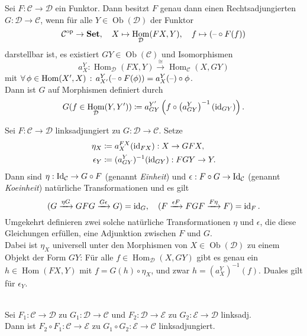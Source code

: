 \documentclass{cheat-sheet}
\newcommand{\SetC}{\mathbf{Set}} %
\newcommand{\op}{\mathrm{op}} %
\DeclareMathOperator{\Hom}{Hom} %
\newcommand{\Cat}{\mathcal{C}} %
\newcommand{\Dat}{\mathcal{D}} %
\newcommand{\Eat}{\mathcal{E}} %
\DeclareMathOperator{\Ob}{Ob} %
\begin{document}
\begin{bem}
  Sei $F : \Cat \to \Dat$ ein Funktor.
  Dann besitzt $F$ genau dann einen Rechtsadjungierten $G : \Dat \to \Cat$, wenn für alle $Y \in \Ob(\Dat)$ der Funktor
  \[
    \Cat^\op \to \SetC, \quad
    X \mapsto \Hom_\Dat(FX, Y), \quad
    f \mapsto (\blank \circ F(f))
  \]
  darstellbar ist, \dh{} es existiert $GY \in \Ob(\Cat)$ und Isomorphismen
  \[ a^Y_X : \Hom_\Dat(FX, Y) \xrightarrow{\cong} \Hom_\Cat(X, GY) \]
  mit $\fa{\phi \in \Hom(X', X)} a^Y_{X'}(\blank \circ F(\phi)) = a^Y_X(\blank) \circ \phi$. \\
  Dann ist $G$ auf Morphismen definiert durch
  \[ G(f \in \Hom_\Dat(Y, Y')) \coloneqq a^{Y'}_{GY} \left( f \circ \left( a^Y_{GY} \right)^{-1} (\id_{GY}) \right). \]
\end{bem}

\begin{bem}
  Sei $F : \Cat \to \Dat$ linksadjungiert zu $G : \Dat \to \Cat$. Setze
  \begin{align*}
    \eta_X & \coloneqq a_X^{FX}(\operatorname{id}_{FX}) : X \to GFX, \\
    \epsilon_Y & \coloneqq (a_{GY}^Y)^{-1}(\operatorname{id}_{GY}) : FGY \to Y.
  \end{align*}
  Dann sind $\eta : \Id_{\Cat} \to G \circ F$ (genannt \emph{Einheit}) und $\epsilon : F \circ G \to \Id_\Cat$ (genannt \emph{Koeinheit}) natürliche Transformationen und es gilt
  \[
    (G \xrightarrow{\eta G} GFG \xrightarrow{G \epsilon} G) = \operatorname{id}_G, \quad
    (F \xrightarrow{\epsilon F} FGF \xrightarrow{F \eta} F) = \operatorname{id}_F.
  \]
  Umgekehrt definieren zwei solche natürliche Transformationen $\eta$ und $\epsilon$, die diese Gleichungen erfüllen, eine Adjunktion zwischen $F$ und $G$. \\
  Dabei ist $\eta_X$ universell unter den Morphismen von $X \in \Ob(\Dat)$ zu einem Objekt der Form $GY$:
  Für alle $f \in \Hom_\Dat(X, GY)$ gibt es genau ein $h \in \Hom(FX, Y)$ mit $f = G(h) \circ \eta_X$, und zwar $h = (a_X^Y)^{-1}(f)$. Duales gilt für $\epsilon_Y$.
\end{bem}

\begin{lem}\mbox{}\\
  Sei $F_1 \!:\! \Cat \to \Dat$ zu $G_1 \!:\! \Dat \to \Cat$ und $F_2 \!:\! \Dat \to \Eat$ zu $G_2 \!:\! \Eat \to \Dat$ linksadj. \\
  Dann ist $F_2 \circ F_1 : \Cat \to \Eat$ zu $G_1 \circ G_2 : \Eat \to \Cat$ linksadjungiert.
\end{lem}
\end{document}
